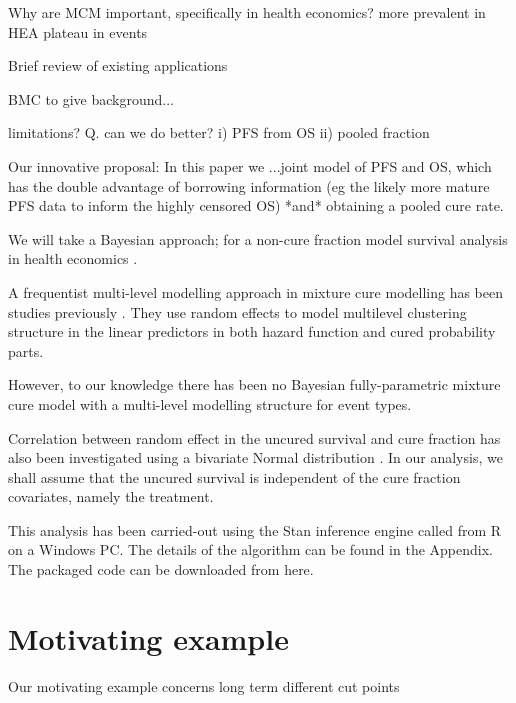 \documentclass[AMA,STIX1COL]{WileyNJD-v2}
\begin{document}
Why are MCM important, specifically in health economics?
more prevalent in HEA
plateau in events

Brief review of existing applications


BMC to give background...

limitations?
Q. can we do better?
i) PFS from OS
ii) pooled fraction

Our innovative proposal:
In this paper we ...joint model of PFS and OS, which has the double advantage of borrowing information
(eg the likely more mature PFS data to inform the highly censored OS)
*and* obtaining a pooled cure rate.

We will take a Bayesian approach; for a non-cure fraction model survival analysis in health economics \cite{Demiris2006,Jackson2010}.

A frequentist multi-level modelling approach in mixture cure modelling has been studies previously \cite{Lai2009}.
They use random effects to model multilevel clustering structure in the linear predictors in both hazard function and cured probability parts.

However, to our knowledge there has been no Bayesian fully-parametric mixture cure model with a multi-level modelling structure for event types.

Correlation between random effect in the uncured survival and cure fraction has also been investigated using a bivariate Normal distribution \cite{Lai2008}.
In our analysis, we shall assume that the uncured survival is independent of the cure fraction covariates, namely the treatment.


This analysis has been carried-out using the Stan inference engine
\cite{carpenter2017stan} called from R \cite{Rcoreteam} on a Windows PC.
The details of the algorithm can be found in the Appendix.
The packaged code can be downloaded from here.


\section{Motivating example}\label{sec:example}
Our motivating example concerns
long term
different cut points
\end{document}
